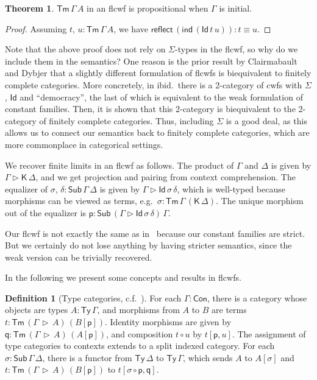 \documentclass[12pt,a4paper,twoside,openany]{book}
\theoremstyle{remark}
\theoremstyle{definition}
\newtheorem{mydefinition}{Definition}
\theoremstyle{theorem}
\newtheorem{theorem}{Theorem}
\newcommand{\ms}[1]{\mathsf{#1}}
\newcommand{\reflect}{\mathsf{reflect}}
\newcommand{\Con}{\mathsf{Con}}
\newcommand{\Sub}{\mathsf{Sub}}
\newcommand{\Tm}{\mathsf{Tm}}
\newcommand{\Ty}{\mathsf{Ty}}
\newcommand{\Id}{\mathsf{Id}}
\newcommand{\ext}{\triangleright}
\newcommand{\p}{\mathsf{p}}
\newcommand{\q}{\mathsf{q}}
\newcommand{\K}{\mathsf{K}}
\begin{document}
\begin{theorem}
\label{thm:flcwf-term-uniqueness}
$\Tm\,\Gamma\,A$ in an flcwf is propositional when $\Gamma$ is initial.
\end{theorem}
\begin{proof} Assuming $t,\,u : \Tm\,\Gamma\,A$, we have
$\reflect\,(\ms{ind}\,(\Id\,t\,u)) : t \equiv u$.
\end{proof}

Note that the above proof does not rely on $\Sigma$-types in the flcwf, so why
do we include them in the semantics? One reason is the prior result by
Clairmabault and Dybjer \cite{clairambault2014biequivalence} that a slightly
different formulation of flcwfs is biequivalent to finitely complete
categories. More concretely, in ibid.\ there is a 2-category of cwfs with
$\Sigma$, $\Id$ and ``democracy'', the last of which is equivalent to the weak
formulation of constant families. Then, it is shown that this 2-category is
biequivalent to the 2-category of finitely complete categories. Thus, including
$\Sigma$ is a good deal, as this allows us to connect our semantics back to
finitely complete categories, which are more commonplace in categorical
settings.

We recover finite limits in an flcwf as follows. The product of $\Gamma$ and
$\Delta$ is given by $\Gamma \ext \K\,\Delta$, and we get projection and pairing
from context comprehension. The equalizer of $\sigma,\,\delta :
\Sub\,\Gamma\,\Delta$ is given by $\Gamma \ext \Id\,\sigma\,\delta$, which is
well-typed because morphisms can be viewed as terms, e.g.\ $\sigma :
\Tm\,\Gamma\,(\K\,\Delta)$. The unique morphism out of the equalizer is $\p :
\Sub\,(\Gamma \ext \Id\,\sigma\,\delta)\,\Gamma$.

Our flcwf is not exactly the same as in \cite{clairambault2014biequivalence}\,
because our constant families are strict. But we certainly do not lose anything
by having stricter semantics, since the weak version can be trivially
recovered.

In the following we present some concepts and results in flcwfs.

\begin{mydefinition}[Type categories, c.f.\ {\cite[Section 2.2]{clairambault2014biequivalence}}]
\label{def:type_categories} For each $\Gamma : \Con$, there is a category
whose objects are types $A : \Ty\,\Gamma$, and morphisms from $A$ to $B$ are
terms $t : \Tm\,(\Gamma\,\ext\,A)\,(B[\p])$. Identity morphisms are given by $\q
: \Tm\,(\Gamma\,\ext\,A)\,(A[\p])$, and composition $t \circ u$ by $t[\p,
  u]$. The assignment of type categories to contexts extends to a split indexed
category. For each $\sigma : \Sub\,\Gamma\,\Delta$, there is a functor from
$\Ty\,\Delta$ to $\Ty\,\Gamma$, which sends $A$ to $A[\sigma]$ and $t :
\Tm\,(\Gamma\,\ext\,A)\,(B[\p])$ to $t[\sigma\circ \p, \q]$.
\end{mydefinition}
\end{document}
